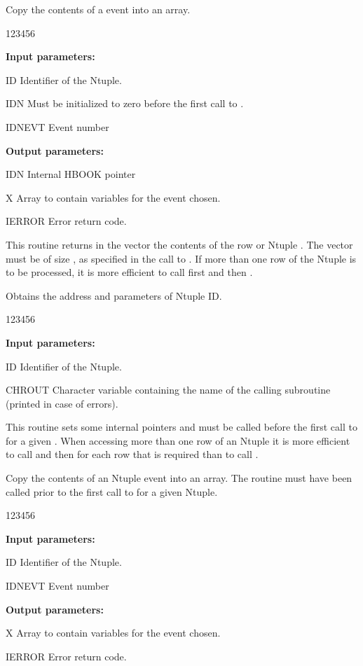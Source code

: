 
\Action
Copy the contents of a \RWN{} event into an array.

\begin{DLttc}{123456}
\item[{\rm\bf Input parameters:}]
\item[ID]     Identifier of the Ntuple.
\item[IDN]    Must be initialized to zero before the first call to .
\item[IDNEVT] Event number
\item[{\rm\bf Output parameters:}]
\item[IDN]    Internal HBOOK pointer
\item[X]      Array to contain variables for the event chosen.
\item[IERROR] Error return code.
\end{DLttc}

This routine returns in the vector  the contents of the
row  or Ntuple .
The vector  must be of size ,
as specified in the call to .
If more than one row of the Ntuple is to be processed, it is more
efficient to call first  and then .


\Action
Obtains the address and parameters of Ntuple ID.
\begin{DLttc}{123456}
\item[{\rm\bf Input parameters:}]
\item[ID]Identifier of the Ntuple.
\item[CHROUT]Character variable containing the name of the calling
subroutine (printed in case of errors).
\end{DLttc}

This routine sets some internal pointers and must be called before
the first call to  for a given \RWN{}. When accessing
more than one row of an Ntuple it is more efficient to call
 and then  for each row that is required
than to call .


\Action
Copy the contents of an Ntuple event into an array.
The routine  must have been called
prior to the first call to  for a given
Ntuple.

\begin{DLttc}{123456}
\item[{\rm\bf Input parameters:}]
\item[ID]Identifier of the Ntuple.
\item[IDNEVT]Event number
\item[{\rm\bf Output parameters:}]
\item[X] Array to contain variables for the event chosen.
\item[IERROR] Error return code.
\end{DLttc}

